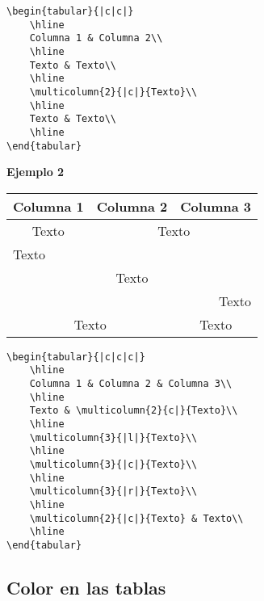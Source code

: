 \begin{myquote}
	\begin{lstlisting}
\begin{tabular}{|c|c|}
	\hline
	Columna 1 & Columna 2\\
	\hline
	Texto & Texto\\
	\hline
	\multicolumn{2}{|c|}{Texto}\\
	\hline
	Texto & Texto\\
	\hline
\end{tabular}		
	\end{lstlisting}			
\end{myquote}



\textbf{Ejemplo 2}

\begin{center}	
	\begin{tabular}{|c|c|c|}
		\hline
		Columna 1 & Columna 2 & Columna 3\\
		\hline
		Texto & \multicolumn{2}{c|}{Texto}\\
		\hline
		\multicolumn{3}{|l|}{Texto}\\
		\hline
		\multicolumn{3}{|c|}{Texto}\\
		\hline
		\multicolumn{3}{|r|}{Texto}\\
		\hline
		\multicolumn{2}{|c|}{Texto} & Texto\\
		\hline
	\end{tabular}
\end{center}

\begin{myquote}
	\begin{lstlisting}
\begin{tabular}{|c|c|c|}
	\hline
	Columna 1 & Columna 2 & Columna 3\\
	\hline
	Texto & \multicolumn{2}{c|}{Texto}\\
	\hline
	\multicolumn{3}{|l|}{Texto}\\
	\hline
	\multicolumn{3}{|c|}{Texto}\\
	\hline
	\multicolumn{3}{|r|}{Texto}\\
	\hline
	\multicolumn{2}{|c|}{Texto} & Texto\\
	\hline
\end{tabular}		
	\end{lstlisting}			
\end{myquote}


\subsection{Color en las tablas}

